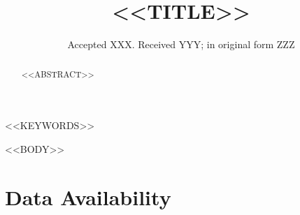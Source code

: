 \documentclass[fleqn,usenatbib]{mnras}
\title[<<SHORT_TITLE>>]{<<TITLE>>}
\date{Accepted XXX. Received YYY; in original form ZZZ}
\begin{document}
\label{firstpage}
\pagerange{\pageref{firstpage}--\pageref{lastpage}}
\maketitle

\begin{abstract}
<<ABSTRACT>>
\end{abstract}

\begin{keywords}
<<KEYWORDS>>
\end{keywords}

<<BODY>>

\section*{Data Availability}




\bsp
\label{lastpage}
\end{document}
